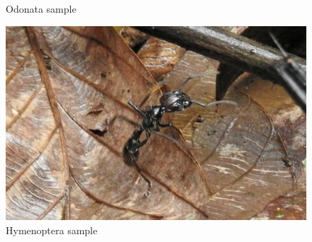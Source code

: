 \begin{figure}[!ht]
\begin{minipage}[t]{.4\textwidth}
        \caption{Odonata sample}
        \label{fig:odonata-sample}
    \end{minipage}
    \begin{minipage}[t]{.4\textwidth}
        \vspace{0.3cm}
        \includegraphics[width=\textwidth]{images/00761_Hymenoptera_Formicidae_eaf1dd96-d5bb-44c2-96b3-220c8104598d.jpg}
        \caption{Hymenoptera sample}
        \label{fig:hymenoptera-sample}
    \end{minipage}
\end{figure}

